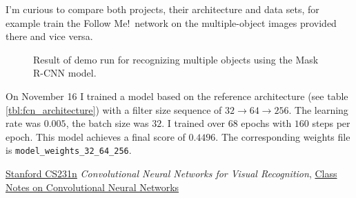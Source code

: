 \documentclass[11pt, onecolumn, oneside, reqno]{article}
\begin{document}
{{{{I'm curious to compare both projects, their architecture and data sets, for example train the Follow Me!\ network on the multiple-object images provided there and vice versa.

\begin{figure}
\noindent
{}
\caption[Demo run for detecting object types]{Result of demo run for recognizing multiple objects using the Mask R-CNN model.}
\label{img:example_mask_rcnn}
\end{figure}

On November 16 I trained a model based on the reference architecture (see table \ref{tbl:fcn_architecture}) with a filter size sequence of $32 \rightarrow 64 \rightarrow 256$. The learning rate was $0.005$, the batch size was $32$. I trained over $68$ epochs with $160$ steps per epoch. This model achieves a final score of $0.4496$. The corresponding weights file is \texttt{model\_weights\_32\_64\_256}.

\begin{thebibliography}{3}
 \href{http://cs231n.stanford.edu/}{Stanford CS231n}
 \textit{Convolutional Neural Networks for Visual Recognition},
 \href{http://cs231n.github.io/convolutional-networks/}{Class Notes on Convolutional Neural Networks}


\end{thebibliography}}}}}
\end{document}
